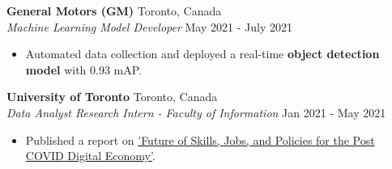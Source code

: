 \documentclass[a4paper]{article}
\begin{document}
\textbf{General Motors (GM)} \hfill Toronto, Canada\\
\textit{Machine Learning Model Developer} \hfill May 2021 - July 2021\\
\vspace{-2.5mm}
\begin{itemize} \itemsep 1pt
	\item Automated data collection and deployed a real-time \textbf{object detection model} with 0.93 mAP.
    \vspace{-1.5mm}
\end{itemize}

\textbf{University of Toronto} \hfill Toronto, Canada\\
\textit{Data Analyst Research Intern - Faculty of Information} \hfill Jan 2021 - May 2021\\
\vspace{-2.5mm}
\begin{itemize} \itemsep 1pt
    \item Published a report on \href{https://futurejobscanada.economics.utoronto.ca/final-report/}{'Future of Skills, Jobs, and Policies for the Post COVID Digital Economy'}.
    \vspace{-1.5mm}
\end{itemize}
\vspace{1mm}
\end{document}
